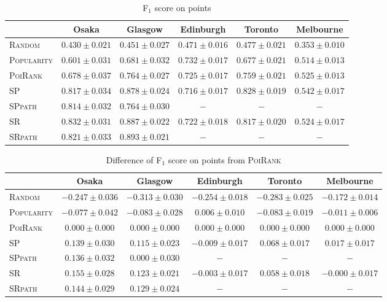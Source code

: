 \begin{table*}[t]
\caption{F$_1$ score on points}
\label{tab:f1}
\centering
\begin{tabular}{l|ccccc} \hline
 & Osaka & Glasgow & Edinburgh & Toronto & Melbourne \\ \hline
\textsc{Random} & $0.430\pm0.021$ & $0.451\pm0.027$ & $0.471\pm0.016$ & $0.477\pm0.021$ & $0.353\pm0.010$ \\
\textsc{Popularity} & $0.601\pm0.031$ & $0.681\pm0.032$ & $\mathbf{0.732\pm0.017}$ & $0.677\pm0.021$ & $0.514\pm0.013$ \\
\textsc{PoiRank} & $0.678\pm0.037$ & $0.764\pm0.027$ & $\mathit{0.725\pm0.017}$ & $0.759\pm0.021$ & $\mathit{0.525\pm0.013}$ \\
\textsc{SP} & $0.817\pm0.034$ & $0.878\pm0.024$ & $0.716\pm0.017$ & $\mathbf{0.828\pm0.019}$ & $\mathbf{0.542\pm0.017}$ \\
\textsc{SPpath} & $0.814\pm0.032$ & $0.764\pm0.030$ & $-$ & $-$ & $-$ \\
\textsc{SR} & $\mathbf{0.832\pm0.031}$ & $\mathit{0.887\pm0.022}$ & $0.722\pm0.018$ & $\mathit{0.817\pm0.020}$ & $0.524\pm0.017$ \\
\textsc{SRpath} & $\mathit{0.821\pm0.033}$ & $\mathbf{0.893\pm0.021}$ & $-$ & $-$ & $-$ \\
\hline
\end{tabular}
\end{table*}

\begin{table*}[t]
\caption{Difference of F$_1$ score on points from \textsc{PoiRank}}
\label{tab:df1}
\centering
\begin{tabular}{l|ccccc} \hline
 & Osaka & Glasgow & Edinburgh & Toronto & Melbourne \\ \hline
\textsc{Random} & $-0.247\pm0.036$ & $-0.313\pm0.030$ & $-0.254\pm0.018$ & $-0.283\pm0.025$ & $-0.172\pm0.014$ \\
\textsc{Popularity} & $-0.077\pm0.042$ & $-0.083\pm0.028$ & $\mathbf{0.006\pm0.010}$ & $-0.083\pm0.019$ & $-0.011\pm0.006$ \\
\textsc{PoiRank} & $0.000\pm0.000$ & $0.000\pm0.000$ & $\mathit{0.000\pm0.000}$ & $0.000\pm0.000$ & $\mathit{0.000\pm0.000}$ \\
\textsc{SP} & $0.139\pm0.030$ & $0.115\pm0.023$ & $-0.009\pm0.017$ & $\mathbf{0.068\pm0.017}$ & $\mathbf{0.017\pm0.017}$ \\
\textsc{SPpath} & $0.136\pm0.032$ & $0.000\pm0.030$ & $-$ & $-$ & $-$ \\
\textsc{SR} & $\mathbf{0.155\pm0.028}$ & $\mathit{0.123\pm0.021}$ & $-0.003\pm0.017$ & $\mathit{0.058\pm0.018}$ & $-0.000\pm0.017$ \\
\textsc{SRpath} & $\mathit{0.144\pm0.029}$ & $\mathbf{0.129\pm0.024}$ & $-$ & $-$ & $-$ \\
\hline
\end{tabular}
\end{table*}

